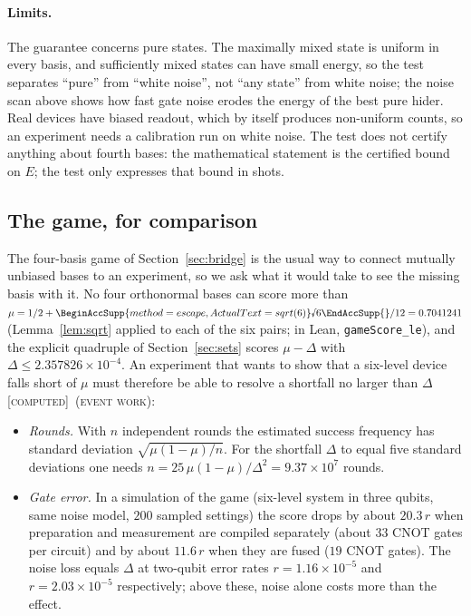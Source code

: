 \documentclass[11pt]{article}
\newcommand{\rnum}[1]{\BeginAccSupp{method=escape,ActualText=sqrt(#1)}\text{\textsurd}#1\EndAccSupp{}}
\newcommand{\rsix}{\rnum{6}}
\newcommand{\E}{E}                       %
\newcommand{\st}[1]{\textsc{[#1]}}
\newcommand{\stcomp}{\st{computed}}
\newcommand{\event}{\textsc{(event work)}}
\theoremstyle{definition}
\theoremstyle{remark}
\begin{document}
\paragraph{Limits.} The guarantee concerns pure states. The maximally mixed state is uniform in every basis, and
sufficiently mixed states can have small energy, so the test separates ``pure'' from ``white noise'', not
``any state'' from white noise; the noise scan above shows how fast gate noise erodes the energy of the best pure
hider. Real devices have biased readout, which by itself produces non-uniform counts, so an experiment needs a
calibration run on white noise. The test does not certify anything about fourth bases: the mathematical statement is
the certified bound on $\E$; the test only expresses that bound in shots.

\subsection{The game, for comparison}\label{sec:game}

The four-basis game of Section~\ref{sec:bridge} is the usual way to connect mutually unbiased bases to an
experiment, so we ask what it would take to see the missing basis with it. No four orthonormal bases can score more than
$\mu=1/2+\rsix/12=0.7041241$ (Lemma~\ref{lem:sqrt} applied to each of the six pairs; in Lean,
\texttt{gameScore\_le}), and the explicit quadruple of Section~\ref{sec:sets} scores $\mu-\Delta$ with
$\Delta\le2.357826\times10^{-4}$. An experiment that wants to show that a six-level device falls short of $\mu$
must therefore be able to resolve a shortfall no larger than $\Delta$ \stcomp\ \event:
\begin{itemize}
\item \emph{Rounds.} With $n$ independent rounds the estimated success frequency has standard deviation
      $\sqrt{\mu(1-\mu)/n}$. For the shortfall $\Delta$ to equal five standard deviations one needs
      $n=25\,\mu(1-\mu)/\Delta^2=9.37\times10^{7}$ rounds.
\item \emph{Gate error.} In a simulation of the game (six-level system in three qubits, same noise model, $200$
      sampled settings) the score drops by about $20.3\,r$ when preparation and measurement are compiled separately
      (about $33$ CNOT gates per circuit) and by about $11.6\,r$ when they are fused ($19$ CNOT gates). The noise loss
      equals $\Delta$ at two-qubit error rates $r=1.16\times10^{-5}$ and $r=2.03\times10^{-5}$ respectively; above
      these, noise alone costs more than the effect.
\end{itemize}
\end{document}
